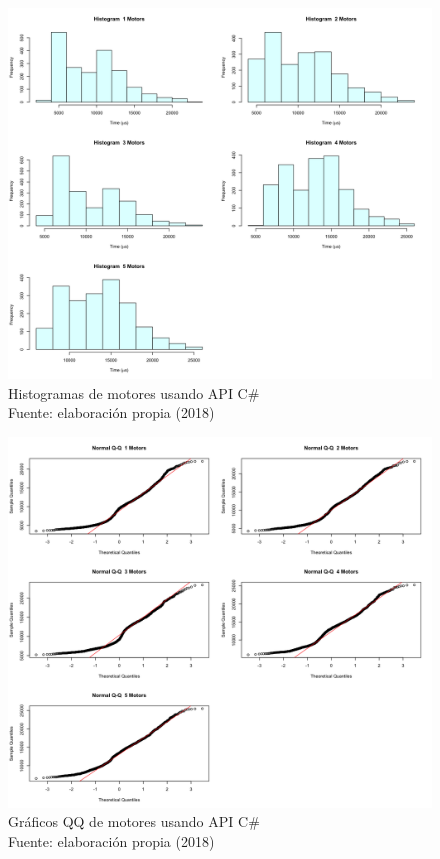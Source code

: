 \begin{figure}
 \begin{center} 
   	\includegraphics[width=1.0\textwidth]{evaluation/graphics/Xamarin/Galaxy-APITest/HistMotorsXamarinGalaxy-APITest.png}
   \centering
    \caption[Histogramas de motores usando API C\# ]{Histogramas de motores usando API C\# \\Fuente: elaboración propia (2018)} 
    \label{fig:xamarin-galaxy-hist-motors-api}
  \end{center}
\end{figure}

\begin{figure}[H]
  \begin{center} 
   	\includegraphics[width=1.0\textwidth]{evaluation/graphics/Xamarin/Galaxy-APITest/NormalQQMotorsXamarinGalaxy-APITest.png} 
   	\centering
    \caption[Gráfico QQ de motores usando API C\# ]{Gráficos QQ de motores usando API C\# \\Fuente: elaboración propia (2018)} 
    \label{fig:xamarin-galaxy-QQ-motors-api}
  \end{center}
\end{figure}

